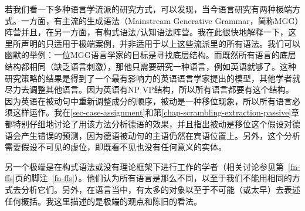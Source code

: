 若我们看一下多种语言学流派的研究方式，可以发现，当今语言研究有两种极端方式。一方面，有主流的生成语法（Mainstream Generative Grammar，简称MGG）阵营并且，在另一方面，有构式语法/认知语法阵营。我在此很快地解释一下，这里所声明的只适用于极端案例，并非适用于以上这些流派里的所有语法。我们可以幽默的举例：一位MGG语言学家的目标是寻找底层结构。而既然所有语言的底层结构都相同（缺乏语言刺激），那他只需要研究一种语言，例如英语就够了。这种研究策略的结果是得到了一个最有影响力的英语语言学家提出的模型，其他学者就尽力去调整其他语言。因为英语有NP VP结构，所以所有语言都要有这个结构。因为英语在被动句中重新调整成分的顺序，被动是一种移位现象，所以所有语言必须这样运作。我在\ref{sec-case-assignment}和第\ref{chap-scrambling-extraction-passive}章都特别仔细地讨论了用该方法分析德语的效果，并且指出被动是移位这个假设对德语会产生错误的预测，因为德语被动句的主语仍然在宾语位置上。另外，这个分析需要假设不可见的虚位，即既看不见也没有任何意义的实体。

另一个极端是在构式语法或没有理论框架下进行工作的学者（相关讨论参见第~\ref{fn-ffs}页的脚注~\ref{fn-ffs}）。他们认为所有语言是那么不同，以至于我们不能用相同的方式去分析它们。另外，在语言当中，有太多的对象以至于不可能（或太早）去表述任何概括。我这里描述的是极端的观点和陈旧的看法。


